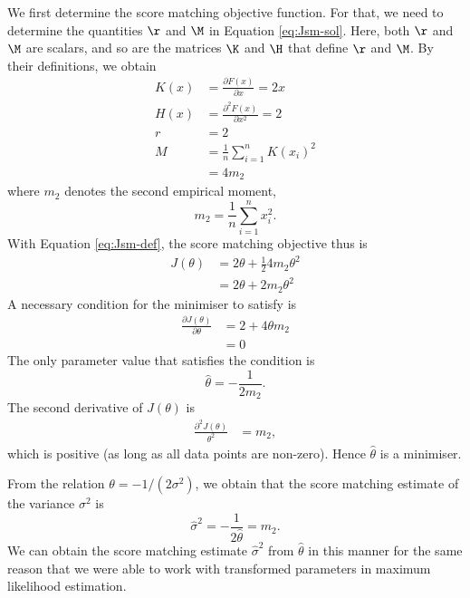 \begin{exenumerate}
\begin{solution}
    We first determine the score matching objective function. For
    that, we need to determine the quantities $\r$ and $\M$ in
    Equation \eqref{eq:Jsm-sol}. Here, both $\r$ and $\M$ are scalars,
    and so are the matrices $\K$ and $\H$ that define $\r$ and $\M$. By
    their definitions, we obtain
    \begin{align}
      K(x) &=  \frac{\partial F(x)}{\partial x} = 2x\\
      H(x) &= \frac{\partial^2 F(x)}{\partial x^2} = 2\\
      r & = 2\\
      M &=  \frac{1}{n}\sum_{i=1}^n K(x_i)^2 \\
      & = 4 m_2
    \end{align}
    where $m_2$ denotes the second empirical moment,
    \begin{equation}
      m_2 = \frac{1}{n} \sum_{i=1}^n x_i^2.
    \end{equation}
    With Equation \eqref{eq:Jsm-def}, the score matching objective thus is
    \begin{align}
      J(\theta) &= 2 \theta + \frac{1}{2} 4 m_2 \theta^2 \\
      & = 2 \theta + 2 m_2 \theta^2
    \end{align}
    A necessary condition for the minimiser to satisfy is
    \begin{align}
      \frac{\partial J(\theta)}{\partial \theta} & = 2 + 4 \theta m_2 \\
      & = 0
    \end{align}
    The only parameter value that satisfies the condition is
    \begin{equation}
      \hat{\theta} = -\frac{1}{2 m_2}.
    \end{equation}
    The second derivative of $J(\theta)$ is
      \begin{align}
      \frac{\partial^2 J(\theta)}{\theta^2} & =  m_2,
    \end{align}
      which is positive (as long as all data points are non-zero). Hence $\hat{\theta}$ is a minimiser.

      From the relation $\theta = -1/(2 \sigma^2)$, we obtain that the score matching estimate of the variance $\sigma^2$ is
      \begin{equation}
        \hat{\sigma}^2 = - \frac{1}{2\hat{\theta}} = m_2.
      \end{equation}
      We can obtain the score matching estimate $\hat{\sigma}^2$ from
      $\hat{\theta}$ in this manner for the same reason that we were
      able to work with transformed parameters in maximum likelihood
      estimation.


\end{solution}
\end{exenumerate}
